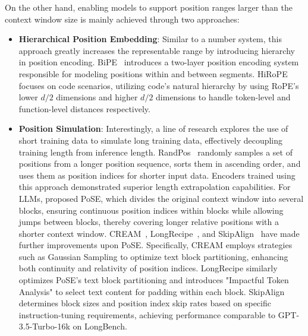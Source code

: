 \documentclass[11pt, a4paper, logo, copyright, nonumbering]{map}
\begin{document}
On the other hand, enabling models to support position ranges larger than the context window size is mainly achieved through two approaches:
\begin{itemize}
\item \textbf{Hierarchical Position Embedding}: Similar to a number system, this approach greatly increases the representable range by introducing hierarchy in position encoding. BiPE~\citep{he2024two} introduces a two-layer position encoding system responsible for modeling positions within and between segments. HiRoPE~\citep{zhang2024hirope} focuses on code scenarios, utilizing code's natural hierarchy by using RoPE's lower $d/2$ dimensions and higher $d/2$ dimensions to handle token-level and function-level distances respectively.
\item \textbf{Position Simulation}: Interestingly, a line of research explores the use of short training data to simulate long training data, effectively decoupling training length from inference length. RandPos~\citep{ruoss2023randomized} randomly samples a set of positions from a longer position sequence, sorts them in ascending order, and uses them as position indices for shorter input data. Encoders trained using this approach demonstrated superior length extrapolation capabilities. For LLMs, \citet{zhu2023pose} proposed PoSE, which divides the original context window into several blocks, ensuring continuous position indices within blocks while allowing jumps between blocks, thereby covering longer relative positions with a shorter context window. CREAM~\citep{wuefficient}, LongRecipe~\citep{hu2024longrecipe}, and SkipAlign~\citep{wu2024long} have made further improvements upon PoSE. Specifically, CREAM employs strategies such as Gaussian Sampling to optimize text block partitioning, enhancing both continuity and relativity of position indices. LongRecipe similarly optimizes PoSE's text block partitioning and introduces "Impactful Token Analysis" to select text content for padding within each block. SkipAlign determines block sizes and position index skip rates based on specific instruction-tuning requirements, achieving performance comparable to GPT-3.5-Turbo-16k on LongBench.
\end{itemize}
\end{document}
